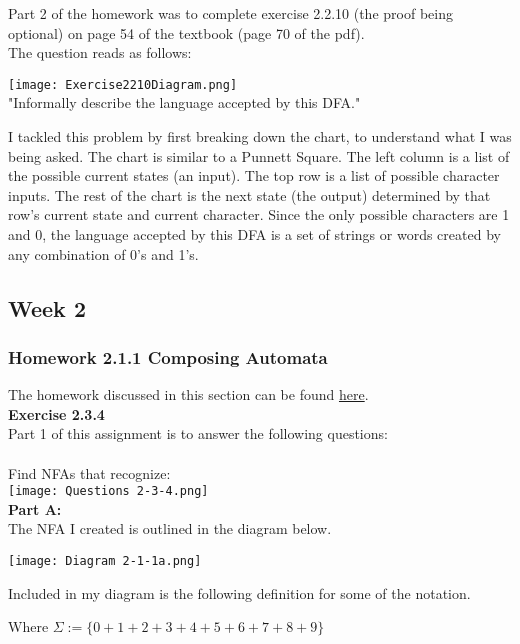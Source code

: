 \documentclass{article}
\theoremstyle{theorem}
\theoremstyle{definition}
\theoremstyle{remark}
\begin{document}
Part 2 of the homework was to complete exercise 2.2.10 (the proof being optional) on page 54 of the textbook (page 70 of the pdf).\\
The question reads as follows:
\begin{center}
    \texttt{[image: Exercise2210Diagram.png]}\\
"Informally describe the language accepted by this DFA."
\end{center}
I tackled this problem by first breaking down the chart, to understand what I was being asked. The chart is similar to a Punnett Square. The left column is a list of the possible current states (an input). The top row is a list of possible character inputs. The rest of the chart is the next state (the output) determined by that row's current state and current character. Since the only possible characters are 1 and 0, the language accepted by this DFA is a set of strings or words created by any combination of 0's and 1's. 


\subsection{Week 2}

\subsubsection{Homework 2.1.1 Composing Automata}
The homework discussed in this section can be found \href{https://hackmd.io/@alexhkurz/ryV_FU7XI}{here}.\\
\textbf{Exercise 2.3.4}\\
Part 1 of this assignment is to answer the following questions:\\
\\
Find NFAs that recognize:\\
\texttt{[image: Questions 2-3-4.png]}\\

\textbf{Part A:}\\
The NFA I created is outlined in the diagram below.
\begin{center}
    \texttt{[image: Diagram 2-1-1a.png]}
\end{center}

Included in my diagram is the following definition for some of the notation.
\begin{center}
    Where $\Sigma := \{0+1+2+3+4+5+6+7+8+9\}$ 
\end{center}
\end{document}
